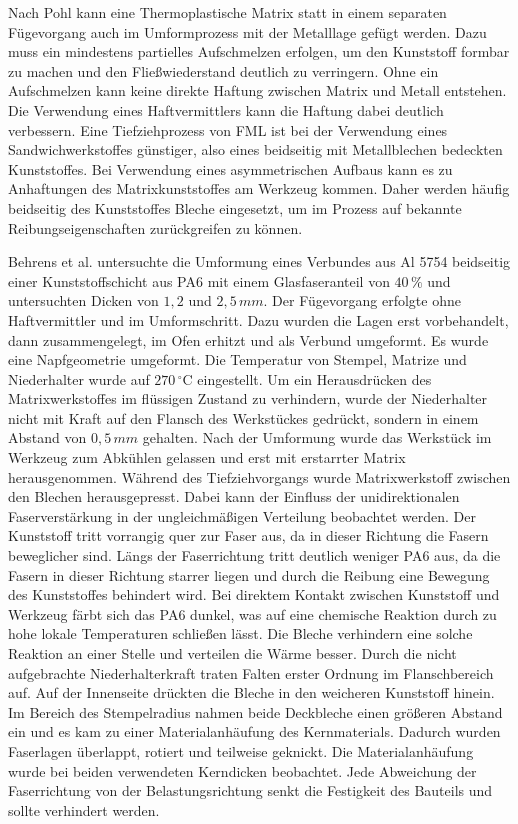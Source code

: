 Nach Pohl \cite{Pohl.2000} kann eine Thermoplastische Matrix statt in einem separaten Fügevorgang auch im Umformprozess mit der Metalllage gefügt werden.
Dazu muss ein mindestens partielles Aufschmelzen erfolgen, um den Kunststoff formbar zu machen und den Fließwiederstand deutlich zu verringern.
Ohne ein Aufschmelzen kann keine direkte Haftung zwischen Matrix und Metall entstehen.
Die Verwendung eines Haftvermittlers kann die Haftung dabei deutlich verbessern.
Eine Tiefziehprozess von FML ist bei der Verwendung eines Sandwichwerkstoffes günstiger, also eines beidseitig mit Metallblechen bedeckten Kunststoffes.
Bei Verwendung eines asymmetrischen Aufbaus kann es zu Anhaftungen des Matrixkunststoffes am Werkzeug kommen.
Daher werden häufig beidseitig des Kunststoffes Bleche eingesetzt, um im Prozess auf bekannte Reibungseigenschaften zurückgreifen zu können. \cite{Behrens.2014}



Behrens et al. \cite{Behrens.2014} untersuchte die Umformung eines Verbundes aus Al 5754 beidseitig einer Kunststoffschicht aus PA6 mit einem Glasfaseranteil von $40\,\%$ und untersuchten Dicken von $1,2$ und $2,5 \, mm$.
Der Fügevorgang erfolgte ohne Haftvermittler und im Umformschritt. Dazu wurden die Lagen erst vorbehandelt, dann zusammengelegt, im Ofen erhitzt und als Verbund umgeformt.
Es wurde eine Napfgeometrie umgeformt.
Die Temperatur von Stempel, Matrize und Niederhalter wurde auf $270 \, ^\circ \text{C}$ eingestellt.
Um ein Herausdrücken des Matrixwerkstoffes im flüssigen Zustand zu verhindern, wurde der Niederhalter nicht mit Kraft auf den Flansch des Werkstückes gedrückt, sondern in einem Abstand von $0,5\,mm$ gehalten.
Nach der Umformung wurde das Werkstück im Werkzeug zum Abkühlen gelassen und erst mit erstarrter Matrix herausgenommen.
Während des Tiefziehvorgangs wurde Matrixwerkstoff zwischen den Blechen herausgepresst.
Dabei kann der Einfluss der unidirektionalen Faserverstärkung in der ungleichmäßigen Verteilung beobachtet werden.
Der Kunststoff tritt vorrangig quer zur Faser aus, da in dieser Richtung die Fasern beweglicher sind.
Längs der Faserrichtung tritt deutlich weniger PA6 aus, da die Fasern in dieser Richtung starrer liegen und durch die Reibung eine Bewegung des Kunststoffes behindert wird.
Bei direktem Kontakt zwischen Kunststoff und Werkzeug färbt sich das PA6 dunkel, was auf eine chemische Reaktion durch zu hohe lokale Temperaturen schließen lässt.
Die Bleche verhindern eine solche Reaktion an einer Stelle und verteilen die Wärme besser.
Durch die nicht aufgebrachte Niederhalterkraft traten Falten erster Ordnung im Flanschbereich auf.
Auf der Innenseite drückten die Bleche in den weicheren Kunststoff hinein.
Im Bereich des Stempelradius nahmen beide Deckbleche einen größeren Abstand ein und es kam zu einer Materialanhäufung des Kernmaterials.
Dadurch wurden Faserlagen überlappt, rotiert und teilweise geknickt.
Die Materialanhäufung wurde bei beiden verwendeten Kerndicken beobachtet.
Jede Abweichung der Faserrichtung von der Belastungsrichtung senkt die Festigkeit des Bauteils und sollte verhindert werden. 

